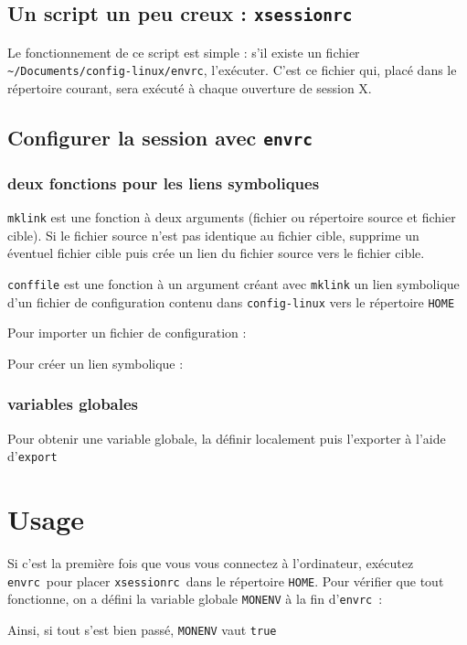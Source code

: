 \documentclass[11pt,a4paper]{article}
\newcommand{\ttt}[1]{\texttt{#1}}
\newcommand{\envrc}[0]{\ttt{envrc}~}
\newcommand{\xsessionrc}[0]{\ttt{xsessionrc}~}
\newcommand{\tld}[0]{\textasciitilde}
\begin{document}
	\subsection{Un script un peu creux : \xsessionrc}

Le fonctionnement de ce script est simple : s'il existe un fichier \ttt{\tld/Documents/config-linux/envrc}, l'exécuter. C'est ce fichier qui, placé dans le répertoire courant, sera exécuté à chaque ouverture de session X.



	\subsection{Configurer la session avec \envrc}

		\subsubsection{deux fonctions pour les liens symboliques}

\ttt{mklink} est une fonction à deux arguments (fichier ou répertoire source et fichier cible). Si le fichier source n'est pas identique au fichier cible, supprime un éventuel fichier cible puis crée un lien du fichier source vers le fichier cible. 



\ttt{conffile} est une fonction à un argument créant avec \ttt{mklink} un lien symbolique d'un fichier de configuration contenu dans \ttt{config-linux} vers le répertoire \ttt{HOME}



Pour importer un fichier de configuration :



Pour créer un lien symbolique :



\subsubsection{variables globales}

Pour obtenir une variable globale, la définir localement puis l'exporter à l'aide d'\ttt{export}



\section{Usage}

Si c'est la première fois que vous vous connectez à l'ordinateur, exécutez \envrc pour placer \xsessionrc dans le répertoire \ttt{HOME}. Pour vérifier que tout fonctionne, on a défini la variable globale \ttt{MONENV} à la fin d'\envrc :

Ainsi, si tout s'est bien passé, \ttt{MONENV} vaut \ttt{true}
\end{document}
